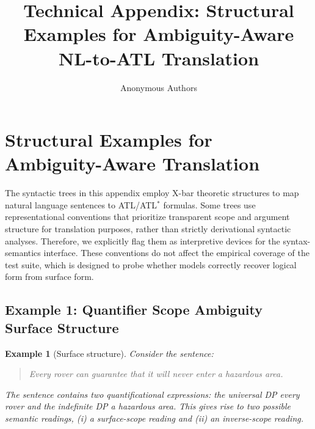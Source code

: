 \documentclass[letterpaper]{article}
\title{Technical Appendix: Structural Examples for Ambiguity-Aware NL-to-ATL Translation}
\author{Anonymous Authors}
\newtheorem{example}{Example}
\begin{document}
\maketitle

\appendix
\section{Structural Examples for Ambiguity-Aware Translation}

The syntactic trees in this appendix employ X-bar theoretic structures to map natural language sentences to ATL/ATL$^\ast$ formulas. Some trees use representational conventions that prioritize transparent scope and argument structure for translation purposes, rather than strictly derivational syntactic analyses. Therefore, we explicitly flag them as interpretive devices for the syntax-semantics interface. These conventions do not affect the empirical coverage of the test suite, which is designed to probe whether models correctly recover logical form from surface form.

\subsection{Example 1: Quantifier Scope Ambiguity Surface Structure}

\begin{example}[Surface structure]
Consider the sentence:
\begin{quote}
Every rover can guarantee that it will never enter a hazardous area.
\end{quote}
The sentence contains two quantificational expressions: the universal DP \emph{every rover} and the indefinite DP \emph{a hazardous area}. This gives rise to two possible semantic readings, (i) a surface-scope reading and (ii) an inverse-scope reading.
\end{example}
\end{document}
